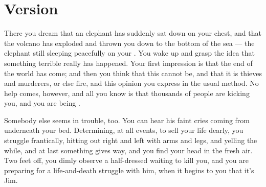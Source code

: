 \documentclass{fiche}
\begin{document}

\newpage
\section{Version}

\begin{version}
There you dream that an elephant has suddenly sat down on your chest, and that the volcano
has exploded and thrown you down to the bottom of the sea --- the elephant still sleeping
peacefully on your . You wake up and grasp the idea that
something terrible really has happened. Your first impression is that the end of the world
has come; and then you think that this cannot be, and that it is thieves and murderers, or
else fire, and this opinion you express in the usual method. No help comes, however, and all
you know is that thousands of people are kicking you, and you are being
.

Somebody else seems in trouble, too. You can hear his faint cries coming from underneath your
bed. Determining, at all events, to sell your life dearly, you struggle frantically, hitting
out right and left with arms and legs, and  yelling the
while, and at last something gives way, and you find your head in the fresh air. Two feet off,
you dimly observe a half-dressed  waiting to kill you, and
you are preparing for a life-and-death struggle with him, when it begins to
 you that it's Jim.
\end{version}

\end{document}
